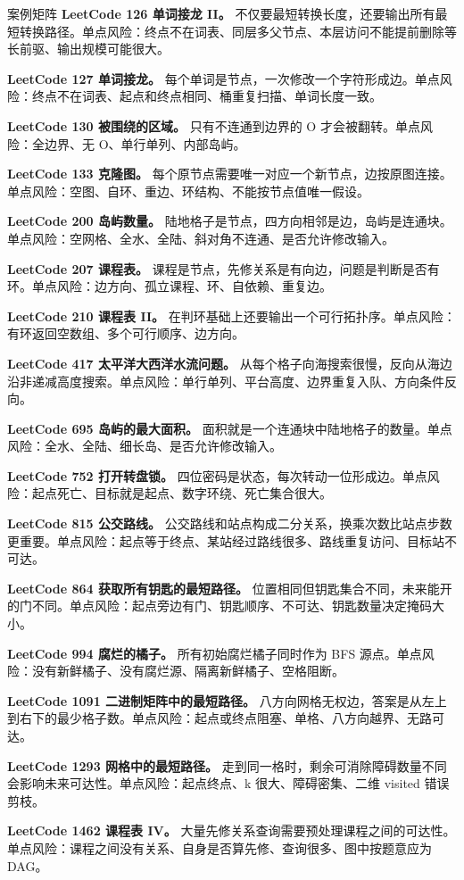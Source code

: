 \begin{principlebox}{案例矩阵}
\textbf{LeetCode 126 单词接龙 II。}
不仅要最短转换长度，还要输出所有最短转换路径。单点风险：终点不在词表、同层多父节点、本层访问不能提前删除等长前驱、输出规模可能很大。

\textbf{LeetCode 127 单词接龙。}
每个单词是节点，一次修改一个字符形成边。单点风险：终点不在词表、起点和终点相同、桶重复扫描、单词长度一致。

\textbf{LeetCode 130 被围绕的区域。}
只有不连通到边界的 O 才会被翻转。单点风险：全边界、无 O、单行单列、内部岛屿。

\textbf{LeetCode 133 克隆图。}
每个原节点需要唯一对应一个新节点，边按原图连接。单点风险：空图、自环、重边、环结构、不能按节点值唯一假设。

\textbf{LeetCode 200 岛屿数量。}
陆地格子是节点，四方向相邻是边，岛屿是连通块。单点风险：空网格、全水、全陆、斜对角不连通、是否允许修改输入。

\textbf{LeetCode 207 课程表。}
课程是节点，先修关系是有向边，问题是判断是否有环。单点风险：边方向、孤立课程、环、自依赖、重复边。

\textbf{LeetCode 210 课程表 II。}
在判环基础上还要输出一个可行拓扑序。单点风险：有环返回空数组、多个可行顺序、边方向。

\textbf{LeetCode 417 太平洋大西洋水流问题。}
从每个格子向海搜索很慢，反向从海边沿非递减高度搜索。单点风险：单行单列、平台高度、边界重复入队、方向条件反向。

\textbf{LeetCode 695 岛屿的最大面积。}
面积就是一个连通块中陆地格子的数量。单点风险：全水、全陆、细长岛、是否允许修改输入。

\textbf{LeetCode 752 打开转盘锁。}
四位密码是状态，每次转动一位形成边。单点风险：起点死亡、目标就是起点、数字环绕、死亡集合很大。

\textbf{LeetCode 815 公交路线。}
公交路线和站点构成二分关系，换乘次数比站点步数更重要。单点风险：起点等于终点、某站经过路线很多、路线重复访问、目标站不可达。

\textbf{LeetCode 864 获取所有钥匙的最短路径。}
位置相同但钥匙集合不同，未来能开的门不同。单点风险：起点旁边有门、钥匙顺序、不可达、钥匙数量决定掩码大小。

\textbf{LeetCode 994 腐烂的橘子。}
所有初始腐烂橘子同时作为 BFS 源点。单点风险：没有新鲜橘子、没有腐烂源、隔离新鲜橘子、空格阻断。

\textbf{LeetCode 1091 二进制矩阵中的最短路径。}
八方向网格无权边，答案是从左上到右下的最少格子数。单点风险：起点或终点阻塞、单格、八方向越界、无路可达。

\textbf{LeetCode 1293 网格中的最短路径。}
走到同一格时，剩余可消除障碍数量不同会影响未来可达性。单点风险：起点终点、k 很大、障碍密集、二维 visited 错误剪枝。

\textbf{LeetCode 1462 课程表 IV。}
大量先修关系查询需要预处理课程之间的可达性。单点风险：课程之间没有关系、自身是否算先修、查询很多、图中按题意应为 DAG。

\end{principlebox}

